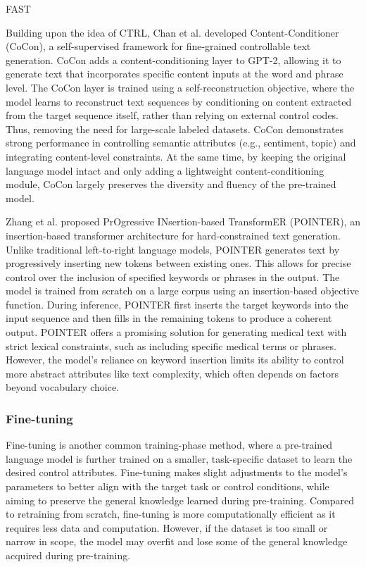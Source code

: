 FAST

Building upon the idea of CTRL, Chan et al. \cite{chan2021cocontentcontrollertextgeneration} developed Content-Conditioner (CoCon), a self-supervised framework for fine-grained controllable text generation. 
CoCon adds a content-conditioning layer to GPT-2, allowing it to generate text that incorporates specific content inputs at the word and phrase level. 
The CoCon layer is trained using a self-reconstruction objective, where the model learns to reconstruct text sequences by conditioning on content extracted from the target sequence itself, rather than relying on external control codes.
Thus, removing the need for large-scale labeled datasets.
CoCon demonstrates strong performance in controlling semantic attributes (e.g., sentiment, topic) and integrating content-level constraints.
At the same time, by keeping the original language model intact and only adding a lightweight content-conditioning module, CoCon largely preserves the diversity and fluency of the pre-trained model.

Zhang et al. \cite{zhang2020pointerconstrainedprogressivetext} proposed PrOgressive INsertion-based TransformER (POINTER), an insertion-based transformer architecture for hard-constrained text generation.
Unlike traditional left-to-right language models, POINTER generates text by progressively inserting new tokens between existing ones. 
This allows for precise control over the inclusion of specified keywords or phrases in the output. 
The model is trained from scratch on a large corpus using an insertion-based objective function. 
During inference, POINTER first inserts the target keywords into the input sequence and then fills in the remaining tokens to produce a coherent output.
POINTER offers a promising solution for generating medical text with strict lexical constraints, such as including specific medical terms or phrases. 
However, the model's reliance on keyword insertion limits its ability to control more abstract attributes like text complexity, which often depends on factors beyond vocabulary choice.

\subsubsection{Fine-tuning}
Fine-tuning is another common training-phase method, where a pre-trained language model is further trained on a smaller, task-specific dataset to learn the desired control attributes. 
Fine-tuning makes slight adjustments to the model's parameters to better align with the target task or control conditions, while aiming to preserve the general knowledge learned during pre-training. 
Compared to retraining from scratch, fine-tuning is more computationally efficient as it requires less data and computation.
However, if the dataset is too small or narrow in scope, the model may overfit and lose some of the general knowledge acquired during pre-training.

